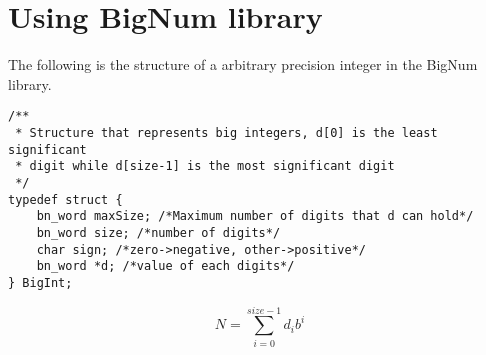 \documentclass{book}
\begin{document}
\chapter{Using BigNum library}
The following is the structure of a arbitrary precision integer in the BigNum library.
\begin{verbatim}
/**
 * Structure that represents big integers, d[0] is the least significant
 * digit while d[size-1] is the most significant digit
 */
typedef struct {
    bn_word maxSize; /*Maximum number of digits that d can hold*/
    bn_word size; /*number of digits*/
    char sign; /*zero->negative, other->positive*/
    bn_word *d; /*value of each digits*/
} BigInt;
\end{verbatim}


\[N = \sum_{i=0}^{size-1}{d_i b^i} \]
\end{document}
